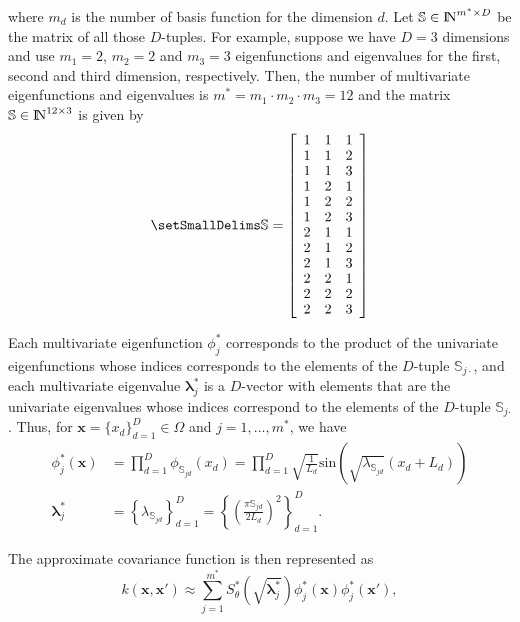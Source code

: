\documentclass[]{interact}
\theoremstyle{plain}%
\theoremstyle{definition}
\theoremstyle{remark}
\begin{document}
\noindent where $m_d$ is the number of basis function for the dimension $d$. Let $\mathbb{S}\in {\rm I\!N}^{m^{\ast} \times D}$ be the matrix of all those $D$-tuples. For example, suppose we have $D=3$ dimensions and use $m_{1}=2$, $m_{2}=2$ and $m_{3}=3$ eigenfunctions and eigenvalues for the first, second and third dimension, respectively. Then, the number of multivariate eigenfunctions and eigenvalues is $m^{\ast} = m_{1} \cdot m_{2} \cdot m_{3} = 12$ and the matrix $\mathbb{S}\in {\rm I\!N}^{12 \times 3}$ is given by
\begin{align}\small
\mathbb{S}=
\left[ {\begin{array}{ccc}
1 & 1 & 1 \nonumber \\
1 & 1 & 2 \\
1 & 1 & 3 \\
1 & 2 & 1 \\
1 & 2 & 2 \\
1 & 2 & 3 \\
2 & 1 & 1 \\
2 & 1 & 2 \\
2 & 1 & 3 \\
2 & 2 & 1 \\
2 & 2 & 2 \\
2 & 2 & 3 
\end{array} } \right]
\end{align} 

Each multivariate eigenfunction $\phi^{\ast}_j$ corresponds to the product of the univariate eigenfunctions whose indices corresponds to the elements of the $D$-tuple $\mathbb{S}_{j\cdotp}$, and each multivariate eigenvalue $\boldsymbol{\lambda}^{\ast}_j$ is a $D$-vector with elements that are the univariate eigenvalues whose indices correspond to the elements of the $D$-tuple $\mathbb{S}_{j\boldsymbol{\cdotp}}$. Thus, for $\mathbf{x}=\{x_d\}_{d=1}^D \in \Omega$ and $j=1,\ldots,m^{\ast}$, we have 
%
\begin{align}
\phi^{\ast}_j(\mathbf{x}) &= \prod_{d=1}^{D} \phi_{\mathbb{S}_{jd}}(x_d) = \prod_{d=1}^{D} \sqrt{\frac{1}{L_d}} \text{sin}\left(\sqrt{\lambda_{\mathbb{S}_{jd}}}(x_d+L_d)\right) \label{eigenvalue_multi} \\
%
\boldsymbol{\lambda}^{\ast}_j &= \left\{ \lambda_{\mathbb{S}_{jd}} \right\}_{d=1}^D =  \left\{ \left(\tfrac{\pi \mathbb{S}_{jd}}{2L_d}\right)^2 \right\}_{d=1}^D. \label{eigenfunction_multi}
\end{align}

\noindent The approximate covariance function is then represented as
%
\begin{equation}\label{approxcov_multi}
k(\mathbf{x},\mathbf{x}') \approx \sum_{j=1}^{m^{\ast}} 
S^{\ast}_{\theta}\left(\sqrt{\boldsymbol{\lambda}^{\ast}_j}\right)
\phi^{\ast}_j(\mathbf{x}) \phi^{\ast}_j(\mathbf{x}'),
\end{equation}
\end{document}
